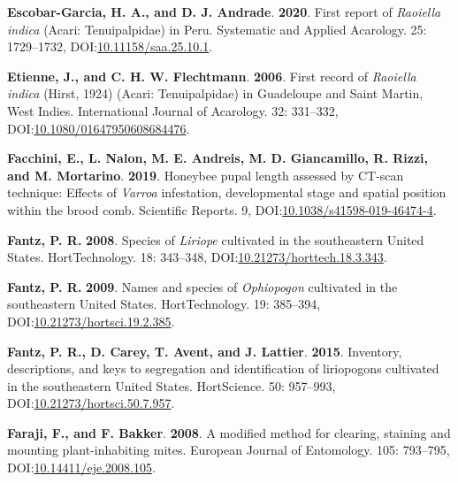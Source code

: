 \documentclass[12pt,final,CPage]{ufthesis}
\newlength{\cslhangindent}
\newenvironment{CSLReferences}[2] %
{%
	\setlength{\parindent}{0pt}
	\ifodd #1 \everypar{\setlength{\hangindent}{\cslhangindent}}\ignorespaces\fi
	\ifnum #2 > 0
	\setlength{\parskip}{#2\baselineskip}
	\fi
}%
{}
\begin{document}
{\begin{CSLReferences}{1}{0}
  \leavevmode{}%
  \textbf{Escobar-Garcia, H. A., and D. J. Andrade}. \textbf{2020}. First report of {\emph{Raoiella indica}} ({Acari}: {Tenuipalpidae}) in {Peru}. Systematic and Applied Acarology. 25: 1729--1732, DOI:\href{https://doi.org/10.11158/saa.25.10.1}{10.11158/saa.25.10.1}.

  \leavevmode{}%
  \textbf{Etienne, J., and C. H. W. Flechtmann}. \textbf{2006}. First record of {\emph{Raoiella indica}} ({Hirst}, 1924) ({Acari}: {Tenuipalpidae}) in {Guadeloupe} and {Saint Martin}, {West Indies}. International Journal of Acarology. 32: 331--332, DOI:\href{https://doi.org/10.1080/01647950608684476}{10.1080/01647950608684476}.

  \leavevmode{}%
  \textbf{Facchini, E., L. Nalon, M. E. Andreis, M. D. Giancamillo, R. Rizzi, and M. Mortarino}. \textbf{2019}. Honeybee pupal length assessed by {CT}-scan technique: Effects of {\emph{Varroa}} infestation, developmental stage and spatial position within the brood comb. Scientific Reports. 9, DOI:\href{https://doi.org/10.1038/s41598-019-46474-4}{10.1038/s41598-019-46474-4}.

  \leavevmode{}%
  \textbf{Fantz, P. R.} \textbf{2008}. Species of {\emph{Liriope}} cultivated in the southeastern {United States}. {HortTechnology}. 18: 343--348, DOI:\href{https://doi.org/10.21273/horttech.18.3.343}{10.21273/horttech.18.3.343}.

  \leavevmode{}%
  \textbf{Fantz, P. R.} \textbf{2009}. Names and species of {\emph{Ophiopogon}} cultivated in the southeastern {United States}. {HortTechnology}. 19: 385--394, DOI:\href{https://doi.org/10.21273/hortsci.19.2.385}{10.21273/hortsci.19.2.385}.

  \leavevmode{}%
  \textbf{Fantz, P. R., D. Carey, T. Avent, and J. Lattier}. \textbf{2015}. Inventory, descriptions, and keys to segregation and identification of liriopogons cultivated in the southeastern {United States}. {HortScience}. 50: 957--993, DOI:\href{https://doi.org/10.21273/hortsci.50.7.957}{10.21273/hortsci.50.7.957}.

  \leavevmode{}%
  \textbf{Faraji, F., and F. Bakker}. \textbf{2008}. A modified method for clearing, staining and mounting plant-inhabiting mites. European Journal of Entomology. 105: 793--795, DOI:\href{https://doi.org/10.14411/eje.2008.105}{10.14411/eje.2008.105}.


\end{CSLReferences}}
\end{document}

